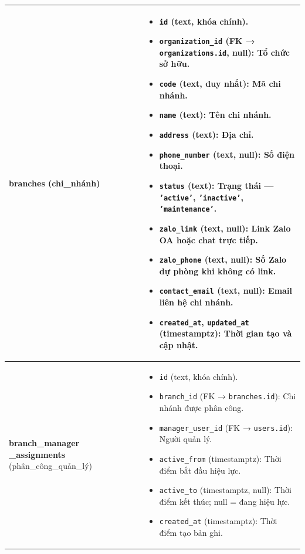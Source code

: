 \begin{longtable}{|>{\centering\arraybackslash}m{4.5cm}|>{\raggedright\arraybackslash}m{11.5cm}|}
\textbf{branches} \newline (chi\_nhánh) &
\begin{itemize}
    \item \texttt{id} (text, khóa chính).
    \item \texttt{organization\_id} (FK → \texttt{organizations.id}, null): Tổ chức sở hữu.
    \item \texttt{code} (text, duy nhất): Mã chi nhánh.
    \item \texttt{name} (text): Tên chi nhánh.
    \item \texttt{address} (text): Địa chỉ.
    \item \texttt{phone\_number} (text, null): Số điện thoại.
    \item \texttt{status} (text): Trạng thái — \texttt{'active'}, \texttt{'inactive'}, \texttt{'maintenance'}.
    \item \texttt{zalo\_link} (text, null): Link Zalo OA hoặc chat trực tiếp.
    \item \texttt{zalo\_phone} (text, null): Số Zalo dự phòng khi không có link.
    \item \texttt{contact\_email} (text, null): Email liên hệ chi nhánh.
    \item \texttt{created\_at}, \texttt{updated\_at} (timestamptz): Thời gian tạo và cập nhật.
\end{itemize} \\ \hline

\textbf{branch\_manager \_assignments} \newline (phân\_công\_quản\_lý) &
\begin{itemize}
    \item \texttt{id} (text, khóa chính).
    \item \texttt{branch\_id} (FK → \texttt{branches.id}): Chi nhánh được phân công.
    \item \texttt{manager\_user\_id} (FK → \texttt{users.id}): Người quản lý.
    \item \texttt{active\_from} (timestamptz): Thời điểm bắt đầu hiệu lực.
    \item \texttt{active\_to} (timestamptz, null): Thời điểm kết thúc; null = đang hiệu lực.
    \item \texttt{created\_at} (timestamptz): Thời điểm tạo bản ghi.
\end{itemize} \\ \hline



\end{longtable}
